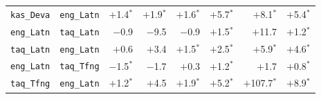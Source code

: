 \begin{longtable}{@{}ll rrr rrr@{}}
\texttt{kas\_Deva} & \texttt{eng\_Latn} & $+$1.4$^{*}$ & $+$1.9$^{*}$ & $+$1.6$^{*}$ & $+$5.7$^{*}$ & $+$8.1$^{*}$ & $+$5.4$^{*}$ \\
\texttt{eng\_Latn} & \texttt{taq\_Latn} & $-$0.9\phantom{$^{*}$} & $-$9.5\phantom{$^{*}$} & $-$0.9\phantom{$^{*}$} & $+$1.5$^{*}$ & $+$11.7\phantom{$^{*}$} & $+$1.2$^{*}$ \\
\texttt{taq\_Latn} & \texttt{eng\_Latn} & $+$0.6\phantom{$^{*}$} & $+$3.4\phantom{$^{*}$} & $+$1.5$^{*}$ & $+$2.5$^{*}$ & $+$5.9$^{*}$ & $+$4.6$^{*}$ \\
\texttt{eng\_Latn} & \texttt{taq\_Tfng} & $-$1.5$^{*}$ & $-$1.7\phantom{$^{*}$} & $+$0.3\phantom{$^{*}$} & $+$1.2$^{*}$ & $+$1.7\phantom{$^{*}$} & $+$0.8$^{*}$ \\
\texttt{taq\_Tfng} & \texttt{eng\_Latn} & $+$1.2$^{*}$ & $+$4.5\phantom{$^{*}$} & $+$1.9$^{*}$ & $+$5.2$^{*}$ & $+$107.7$^{*}$ & $+$8.9$^{*}$ \\
\end{longtable}
\endgroup
